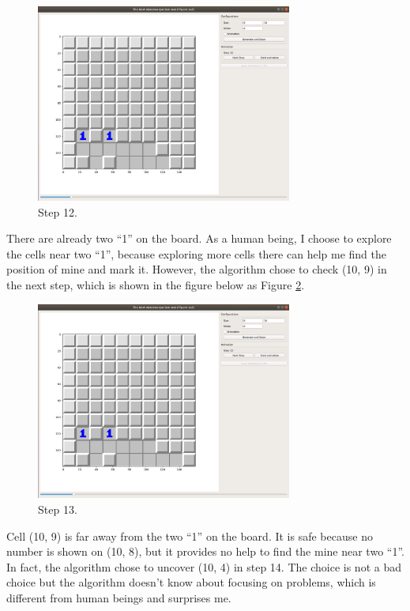 \documentclass[letter]{article}
\begin{document}
\begin{enumerate}
	\begin{figure}[H]
		\centering
		\includegraphics[width=0.75\textwidth]{../pics/2.png}
		\caption{\label{fig:2} Step 12.}
	\end{figure}
	There are already two ``1'' on the board. As a human being, I choose to explore the cells near two ``1'', because exploring more cells there can help me find the position of mine and mark it. However, the algorithm chose to check (10, 9) in the next step, which is shown in the figure below as Figure \ref{fig:3}.
	
	\begin{figure}[H]
	\centering
	\includegraphics[width=0.75\textwidth]{../pics/3.png}
	\caption{\label{fig:3} Step 13.}
	\end{figure}
	Cell (10, 9) is far away from the two ``1'' on the board. It is safe because no number is shown on (10, 8), but it provides no help to find the mine near two ``1''. In fact, the algorithm chose to uncover (10, 4) in step 14. The choice is not a bad choice but the algorithm doesn’t know about focusing on problems, which is different from human beings and surprises me.
	

\end{enumerate}
\end{document}
